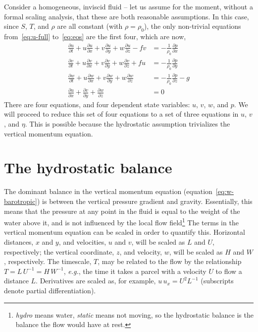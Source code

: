 \documentclass[11pt]{report}
\numberwithin{equation}{section}
\begin{document}
Consider a homogeneous, inviscid fluid -- let us assume for the moment, without a formal scaling analysis, that these are both reasonable assumptions.  In this case, since $S$, $T$, and $\rho$ are all constant (with $\rho=\rho_0$), the only non-trivial equations from~\ref{eq:u-full} to~\ref{eq:eos} are the first four, which are now,
\begin{align}
    \frac{\partial u}{\partial t} 
        + u\frac{\partial u}{\partial x} 
        + v\frac{\partial u}{\partial y} 
        + w\frac{\partial u}{\partial z} - fv 
                &= -\frac{1}{\rho_0}\frac{\partial p}{\partial x} \label{eq:u-barotropic} \\
    \frac{\partial v}{\partial t} 
        + u\frac{\partial v}{\partial x} 
        + v\frac{\partial v}{\partial y} 
        + w\frac{\partial v}{\partial z} + fu 
                &= -\frac{1}{\rho_0}\frac{\partial p}{\partial y}  \label{eq:v-barotropic} \\
    \frac{\partial w}{\partial t}  
        + u\frac{\partial w}{\partial x} 
        + v\frac{\partial w}{\partial y} 
        + w\frac{\partial w}{\partial z}
                &= -\frac{1}{\rho_0}\frac{\partial p}{\partial z} - g \label{eq:w-barotropic}\\
    \frac{\partial u}{\partial x} 
        + \frac{\partial v}{\partial y} 
        + \frac{\partial w}{\partial z} 
                &= 0 \label{eq:cont-barotropic}
\end{align}
There are four equations, and four dependent state variables: $u$, $v$, $w$, and $p$.  We will proceed to reduce this set of four equations to a set of three equations in $u$, $v$, and $\eta$.  This is possible because the hydrostatic assumption trivializes the vertical momentum equation.

\section{The hydrostatic balance}

The dominant balance in the vertical momentum equation (equation~\ref{eq:w-barotropic}) is between the vertical pressure gradient and gravity.  Essentially, this means that the pressure at any point in the fluid is equal to the weight of the water above it, and is not influenced by the local flow field\footnote{\emph{hydro} means water, \emph{static} means not moving, so the hydrostatic balance is the balance the flow would have at rest.}  The terms in the vertical momentum equation can be scaled in order to quantify this.  Horizontal distances, $x$ and $y$, and velocities, $u$ and $v$, will be scaled as $L$ and $U$, respectively; the vertical coordinate, $z$, and velocity, $w$, will be scaled as $H$ and $W$, respectively.  The timescale, $T$, may be related to the flow by the relationship $T=L\,U^{-1}=H\,W^{-1}$, \emph{e.g.}, the time it takes a parcel with a velocity $U$ to flow a distance $L$.  Derivatives are scaled as, for example, $u\,u_x = U^2 L^{-1}$ (subscripts denote partial differentiation).
\end{document}

